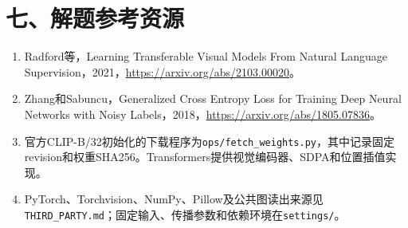 \documentclass[UTF8,fontset=none,zihao=-4]{ctexart}
\newcommand{\code}[1]{\nolinkurl{#1}}
\begin{document}
\section*{七、解题参考资源}
\begin{enumerate}
\item Radford等，Learning Transferable Visual Models From Natural Language Supervision，2021，\url{https://arxiv.org/abs/2103.00020}。
\item Zhang和Sabuncu，Generalized Cross Entropy Loss for Training Deep Neural Networks with Noisy Labels，2018，\url{https://arxiv.org/abs/1805.07836}。
\item 官方CLIP-B/32初始化的下载程序为\code{ops/fetch_weights.py}，其中记录固定revision和权重SHA256。Transformers提供视觉编码器、SDPA和位置插值实现。
\item PyTorch、Torchvision、NumPy、Pillow及公共图读出来源见\code{THIRD_PARTY.md}；固定输入、传播参数和依赖环境在\code{settings/}。
\end{enumerate}
\end{document}
